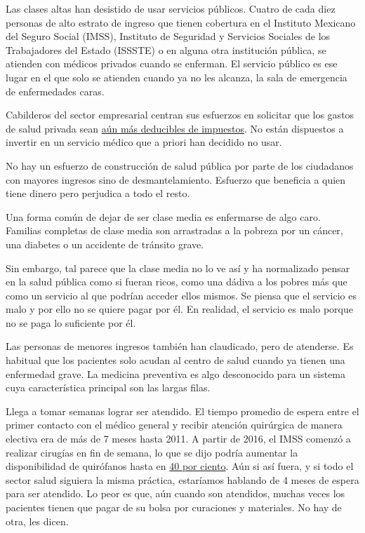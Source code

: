 Las clases altas han desistido de usar servicios públicos. Cuatro de
cada diez personas de alto estrato de ingreso que tienen cobertura en el
Instituto Mexicano del Seguro Social (IMSS), Instituto de Seguridad y
Servicios Sociales de los Trabajadores del Estado (ISSSTE) o en alguna
otra institución pública, se atienden con médicos privados cuando se
enferman. El servicio público es ese lugar en el que solo se atienden
cuando ya no les alcanza, la sala de emergencia de enfermedades caras.

Cabilderos del sector empresarial centran sus esfuerzos en solicitar que
los gastos de salud privada sean
\href{https://www.sat.gob.mx/consulta/23972/conoce-las-deducciones-personales}{aún
más deducibles de impuestos}. No están dispuestos a invertir en un
servicio médico que a priori han decidido no usar.

No hay un esfuerzo de construcción de salud pública por parte de los
ciudadanos con mayores ingresos sino de desmantelamiento. Esfuerzo que
beneficia a quien tiene dinero pero perjudica a todo el resto.

Una forma común de dejar de ser clase media es enfermarse de algo caro.
Familias completas de clase media son arrastradas a la pobreza por un
cáncer, una diabetes o un accidente de tránsito grave.

Sin embargo, tal parece que la clase media no lo ve así y ha normalizado
pensar en la salud pública como si fueran ricos, como una dádiva a los
pobres más que como un servicio al que podrían acceder ellos mismos. Se
piensa que el servicio es malo y por ello no se quiere pagar por él. En
realidad, el servicio es malo porque no se paga lo suficiente por él.

Las personas de menores ingresos también han claudicado, pero de
atenderse. Es habitual que los pacientes solo acudan al centro de salud
cuando ya tienen una enfermedad grave. La medicina preventiva es algo
desconocido para un sistema cuya característica principal son las largas
filas.

Llega a tomar semanas lograr ser atendido. El tiempo promedio de espera
entre el primer contacto con el médico general y recibir atención
quirúrgica de manera electiva era de más de 7 meses hasta 2011. A partir
de 2016, el IMSS comenzó a realizar cirugías en fin de semana, lo que se
dijo podría aumentar la disponibilidad de quirófanos hasta en
\href{https://www.gob.mx/imss/acciones-y-programas/cirugias-en-fines-de-semana-optimizacion-de-los-quirofanos-del-imss}{40
por ciento}. Aún si así fuera, y si todo el sector salud siguiera la
misma práctica, estaríamos hablando de 4 meses de espera para ser
atendido. Lo peor es que, aún cuando son atendidos, muchas veces los
pacientes tienen que pagar de su bolsa por curaciones y materiales. No
hay de otra, les dicen.

